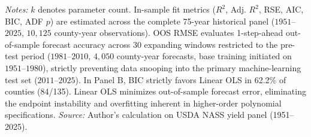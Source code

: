 \begin{table}[htbp]
\centering
\small
\caption{Statistical and diagnostic comparison of candidate detrending models across the 75-year panel (1951--2025).}
\label{tab:detrending_comparison}
\vspace{1ex}
\raggedright
\scriptsize{\textit{Notes:} $k$ denotes parameter count. In-sample fit metrics ($R^2$, Adj. $R^2$, RSE, AIC, BIC, ADF $p$) are estimated across the complete 75-year historical panel ($1951$--$2025$, $10{,}125$ county-year observations). OOS RMSE evaluates 1-step-ahead out-of-sample forecast accuracy across 30 expanding windows restricted to the pre-test period ($1981$--$2010$, $4{,}050$ county-year forecasts, base training initiated on $1951$--$1980$), strictly preventing data snooping into the primary machine-learning test set ($2011$--$2025$). In Panel B, BIC strictly favors Linear OLS in 62.2\% of counties (84/135). Linear OLS minimizes out-of-sample forecast error, eliminating the endpoint instability and overfitting inherent in higher-order polynomial specifications. \textit{Source:} Author's calculation on USDA NASS yield panel (1951--2025).}
\end{table}
